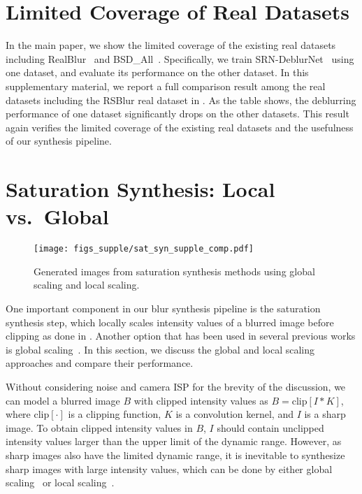 \section{Limited Coverage of Real Datasets}


In the main paper, we show the limited coverage of the existing real datasets including RealBlur~\cite{jsrim-ECCV2020} and BSD\_All~\cite{Zhong_2020_ECCV,Zhong_2021_arxiv}.
Specifically, we train SRN-DeblurNet~\cite{Tao-CVPR18} using one dataset, and evaluate its performance on the other dataset.
In this supplementary material, we report a full comparison result among the real datasets including the RSBlur real dataset in .
As the table shows, the deblurring performance of one dataset significantly drops on the other datasets.
This result again verifies the limited coverage of the existing real datasets and the usefulness of our synthesis pipeline.

\section{Saturation Synthesis: Local vs.~Global}

\begin{figure}[t]
\centering
\texttt{[image: figs\_supple/sat\_syn\_supple\_comp.pdf]}
\caption{Generated images from saturation synthesis methods using global scaling and local scaling.}
\label{fig:generating_saturation_synthesis}
\end{figure}

One important component in our blur synthesis pipeline is the saturation synthesis step, which locally scales intensity values of a blurred image before clipping as done in \cite{Hu-CVPR14}.
Another option that has been used in several previous works is global scaling~\cite{PAN_2017_TPAMI, Chen_2021_CVPR, NEURIPS2018_0aa1883c}.
In this section, we discuss the global and local scaling approaches and compare their performance.

Without considering noise and camera ISP for the brevity of the discussion, we can model a blurred image $B$ with clipped intensity values as $B=\textrm{clip}[I*K]$, where $\textrm{clip}[\cdot]$ is a clipping function, $K$ is a convolution kernel, and $I$ is a sharp image.
To obtain clipped intensity values in $B$, $I$ should contain unclipped intensity values larger than the upper limit of the dynamic range.
However, as sharp images also have the limited dynamic range, it is inevitable to synthesize sharp images with large intensity values, which can be done by either global scaling~\cite{PAN_2017_TPAMI, Chen_2021_CVPR, NEURIPS2018_0aa1883c} or local scaling~\cite{Hu-CVPR14}.

